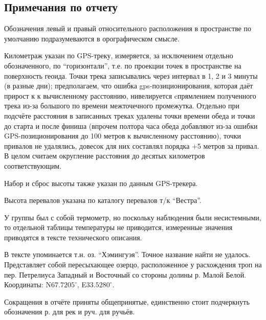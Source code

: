 \subsection{Примечания по отчету}
Обозначения левый и правый относительного расположения в пространстве по умолчанию подразумеваются в орографическом смысле.

Километраж указан по GPS-треку, измеряется, за исключением отдельно обозначенного, по ``горизонтали'',
т.е. по проекции точек в пространстве на поверхность геоида. Точки трека записывались через интервал в 1, 2 и 3 минуты
(в разные дни); предполагаем, что ошибка gps-позиционирования, которая даёт прирост к к вычисленному расстоянию,
нивелируется cпрямлением полученного трека из-за большого по времени межточечного промежутка.
Отдельно при подсчёте расстояния в записанных треках удалены точки времени обеда и точки до старта и после финиша
(впрочем полтора часа обеда добавляют из-за ошибки GPS-позиционирования до 100 метров к вычисленному расстоянию),
точки привалов не удалялись, довесок для них составлял порядка +5 метров за привал.
В целом считаем округление расстояния до десятых километров соответствующим.

Набор и сброс высоты также указан по данным GPS-трекера.

Высота перевалов указана по каталогу перевалов т/к ``Вестра''.

У группы был с собой термометр, но поскольку наблюдения были несистемными, то отдельной таблицы температуры не приводится,
измеренные значения приводятся в тексте технического описания.

В тексте упоминается т.н. оз. ``Хэмингуэя''. Точное название найти не удалось.
Представляет собой пересыхающее озерцо, расположенное у расхождения троп на пер. Петрелиуса Западный и Восточный со
стороны долины р. Малой Белой. Координаты: N$67.7205^{\circ}$, E$33.5280^{\circ}$.

Сокращения в отчёте приняты общепринятые, единственно стоит подчеркнуть обозначения р. для рек и руч. для ручьёв.
